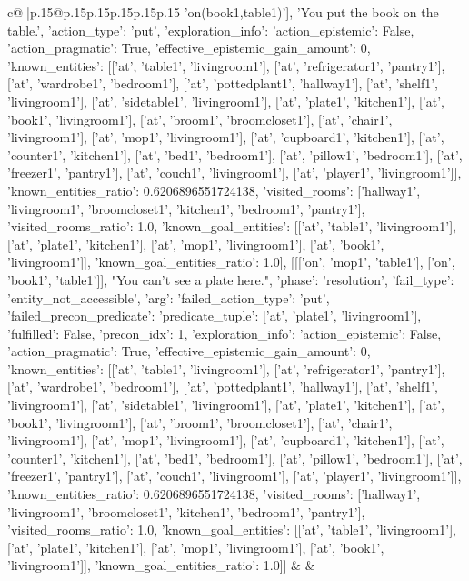 \documentclass{article}
\begin{document}
{\begin{supertabular}{c@{$\;$}|p{.15\linewidth}@{}p{.15\linewidth}p{.15\linewidth}p{.15\linewidth}p{.15\linewidth}p{.15\linewidth}}
{{{'on(book1,table1)'], 'You put the book on the table.', {'action_type': 'put', 'exploration_info': {'action_epistemic': False, 'action_pragmatic': True, 'effective_epistemic_gain_amount': 0, 'known_entities': [['at', 'table1', 'livingroom1'], ['at', 'refrigerator1', 'pantry1'], ['at', 'wardrobe1', 'bedroom1'], ['at', 'pottedplant1', 'hallway1'], ['at', 'shelf1', 'livingroom1'], ['at', 'sidetable1', 'livingroom1'], ['at', 'plate1', 'kitchen1'], ['at', 'book1', 'livingroom1'], ['at', 'broom1', 'broomcloset1'], ['at', 'chair1', 'livingroom1'], ['at', 'mop1', 'livingroom1'], ['at', 'cupboard1', 'kitchen1'], ['at', 'counter1', 'kitchen1'], ['at', 'bed1', 'bedroom1'], ['at', 'pillow1', 'bedroom1'], ['at', 'freezer1', 'pantry1'], ['at', 'couch1', 'livingroom1'], ['at', 'player1', 'livingroom1']], 'known_entities_ratio': 0.6206896551724138, 'visited_rooms': ['hallway1', 'livingroom1', 'broomcloset1', 'kitchen1', 'bedroom1', 'pantry1'], 'visited_rooms_ratio': 1.0, 'known_goal_entities': [['at', 'table1', 'livingroom1'], ['at', 'plate1', 'kitchen1'], ['at', 'mop1', 'livingroom1'], ['at', 'book1', 'livingroom1']], 'known_goal_entities_ratio': 1.0}}], [[['on', 'mop1', 'table1'], ['on', 'book1', 'table1']], "You can't see a plate here.", {'phase': 'resolution', 'fail_type': 'entity_not_accessible', 'arg': {'failed_action_type': 'put', 'failed_precon_predicate': {'predicate_tuple': ['at', 'plate1', 'livingroom1'], 'fulfilled': False, 'precon_idx': 1}}, 'exploration_info': {'action_epistemic': False, 'action_pragmatic': True, 'effective_epistemic_gain_amount': 0, 'known_entities': [['at', 'table1', 'livingroom1'], ['at', 'refrigerator1', 'pantry1'], ['at', 'wardrobe1', 'bedroom1'], ['at', 'pottedplant1', 'hallway1'], ['at', 'shelf1', 'livingroom1'], ['at', 'sidetable1', 'livingroom1'], ['at', 'plate1', 'kitchen1'], ['at', 'book1', 'livingroom1'], ['at', 'broom1', 'broomcloset1'], ['at', 'chair1', 'livingroom1'], ['at', 'mop1', 'livingroom1'], ['at', 'cupboard1', 'kitchen1'], ['at', 'counter1', 'kitchen1'], ['at', 'bed1', 'bedroom1'], ['at', 'pillow1', 'bedroom1'], ['at', 'freezer1', 'pantry1'], ['at', 'couch1', 'livingroom1'], ['at', 'player1', 'livingroom1']], 'known_entities_ratio': 0.6206896551724138, 'visited_rooms': ['hallway1', 'livingroom1', 'broomcloset1', 'kitchen1', 'bedroom1', 'pantry1'], 'visited_rooms_ratio': 1.0, 'known_goal_entities': [['at', 'table1', 'livingroom1'], ['at', 'plate1', 'kitchen1'], ['at', 'mop1', 'livingroom1'], ['at', 'book1', 'livingroom1']], 'known_goal_entities_ratio': 1.0}}]] 
	  } 
	   } 
	   } 
	 & & \\ 
 


\end{supertabular}}
\end{document}
